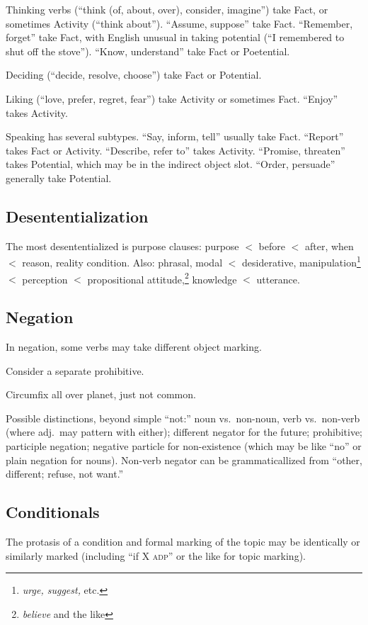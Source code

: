 \documentclass[11pt]{article}
\newcommand{\I}[1]{\textsc{#1}}   %
\begin{document}
Thinking verbs (``think (of, about, over), consider, imagine'') take
Fact, or sometimes Activity (``think about'').  ``Assume, suppose''
take Fact.  ``Remember, forget'' take Fact, with English unusual in
taking potential (``I remembered to shut off the stove'').  ``Know,
understand'' take Fact or Poetential.

Deciding (``decide, resolve, choose'') take Fact or Potential.

Liking (``love, prefer, regret, fear'') take Activity or sometimes
Fact.  ``Enjoy'' takes Activity.

Speaking has several subtypes.  ``Say, inform, tell'' usually take
Fact.  ``Report'' takes Fact or Activity.  ``Describe, refer to''
takes Activity.  ``Promise, threaten'' takes Potential, which may be
in the indirect object slot.  ``Order, persuade'' generally take
Potential. 

\subsection{Desententialization}
The most desententialized is purpose clauses: purpose $<$ before $<$
after, when $<$ reason, reality condition.  Also: phrasal, modal $<$
desiderative, manipulation\footnote{\textit{urge, suggest,} etc.} $<$
perception $<$ propositional attitude,\footnote{\textit{believe} and
the like} knowledge $<$ utterance.



\subsection{Negation}
In negation, some verbs may take different object marking.

Consider a separate prohibitive.

Circumfix all over planet, just not common.

Possible distinctions, beyond simple ``not:'' noun vs.\ non-noun, verb
vs.\ non-verb (where adj.\ may pattern with either); different negator
for the future; prohibitive; participle negation; negative particle
for non-existence (which may be like ``no'' or plain negation for
nouns).  Non-verb negator can be grammaticallized from ``other,
different; refuse, not want.''


\subsection{Conditionals}
The protasis of a condition and formal marking of the topic may be
identically or similarly marked (including ``if X \I{adp}'' or the
like for topic marking).
\end{document}
